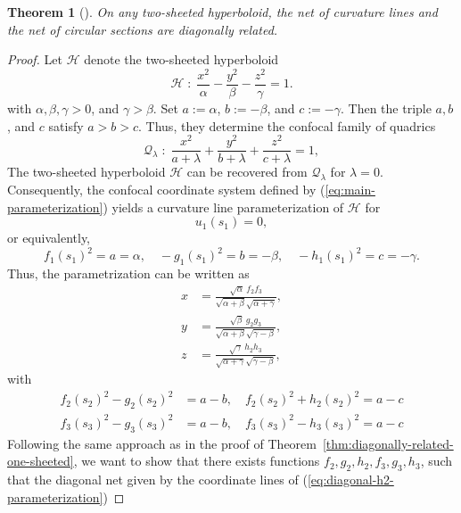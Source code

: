 \documentclass[10pt, a4paper]{article}
\theoremstyle{BoldTopSpacing}
\newtheorem{theorem}{Theorem}[section]
\theoremstyle{BoldTopSpacing}
\theoremstyle{BoldTopSpacing}
\theoremstyle{BoldTopBottomSpacing}
\theoremstyle{BoldTopSpacing}
\theoremstyle{BoldTopBottomSpacing}
\theoremstyle{remark}
\begin{document}
\begin{theorem}[]
\label{thm:diagonally-related-two-sheeted}
On any two-sheeted hyperboloid, the net of curvature lines and the net of circular sections are diagonally related.
\end{theorem}
\begin{proof}
Let $\mathcal{H}$ denote the two-sheeted hyperboloid
\[
    \mathcal{H} \; : \; \frac{x^2}{\alpha} - \frac{y^2}{\beta} - \frac{z^2}{\gamma} = 1.
\]
with $\alpha, \beta, \gamma > 0$, and $\gamma > \beta$. Set $a := \alpha$, $b := -\beta$, and $c := -\gamma$. Then the triple $a, b$, and $c$ satisfy $a > b > c$. Thus, they determine the confocal family of quadrics
\[
    \mathcal{Q}_{\lambda} \; : \; \frac{x^2}{a+\lambda} + \frac{y^2}{b+\lambda} + \frac{z^2}{c+\lambda} = 1,
\]
The two-sheeted hyperboloid $\mathcal{H}$ can be recovered from $\mathcal{Q}_{\lambda}$ for $\lambda = 0$. Consequently, the confocal coordinate system defined by (\ref{eq:main-parameterization}) yields a curvature line parameterization of $\mathcal{H}$ for
\[
    u_{1}(s_{1}) = 0,
\]
or equivalently,
\[
    f_{1}(s_{1})^2 = a = \alpha, \quad -g_{1}(s_{1})^2 = b = -\beta, \quad -h_{1}(s_{1})^2 = c = -\gamma.
\]
Thus, the parametrization can be written as
\begin{equation}
\begin{aligned}
\label{eq:diagonal-h2-parameterization}
    x &= \frac{\sqrt{\alpha} \ f_{2} f_{3}}{\sqrt{\alpha + \beta}\sqrt{\alpha + \gamma}}, \\
    y &= \frac{\sqrt{\beta} \ g_{2} g_{3}}{\sqrt{\alpha + \beta}\sqrt{\gamma - \beta}}, \\
    z &= \frac{\sqrt{ \gamma } \ h_{2} h_{3}}{\sqrt{\alpha + \gamma}\sqrt{\gamma - \beta}},
\end{aligned}
\end{equation}
with
\begin{equation}
\begin{aligned}
\label{eq:functional-relations-h2}
f_{2}(s_{2})^2 - g_{2}(s_{2})^2 &= a - b, \quad f_{2}(s_{2})^2 + h_{2}(s_{2})^2 = a - c \\
f_{3}(s_{3})^2 - g_{3}(s_{3})^2 &= a - b, \quad f_{3}(s_{3})^2 - h_{3}(s_{3})^2 = a - c
\end{aligned}
\end{equation}
Following the same approach as in the proof of Theorem~\ref{thm:diagonally-related-one-sheeted}, we want to show that there exists functions $f_2, g_2, h_2, f_3, g_3, h_3$, such that the diagonal net given by the coordinate lines of (\ref{eq:diagonal-h2-parameterization})

\end{proof}
\end{document}
